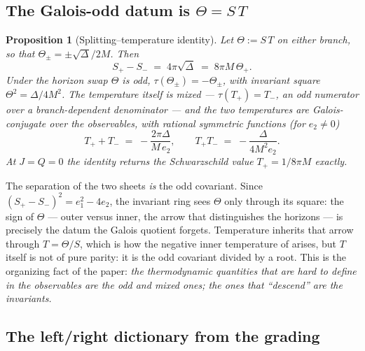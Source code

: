 \documentclass[11pt]{article}
\newtheorem{proposition}[theorem]{Proposition}
\theoremstyle{definition}
\theoremstyle{remark}
\newcommand{\disc}{\Delta}
\begin{document}
\subsection{The Galois-odd datum is \texorpdfstring{$\Theta=S\,T$}{Theta = S T}}

\begin{proposition}[Splitting--temperature identity]
\label{prop:splitting}
Let $\Theta:=S\,T$ on either branch, so that $\Theta_\pm=\pm\sqrt{\disc}/2M$.
Then
\[
S_+ - S_- \;=\; 4\pi\sqrt{\disc}\;=\;8\pi M\,\Theta_+ .
\]
Under the horizon swap $\Theta$ is odd, $\tau(\Theta_\pm)=-\Theta_\pm$, with
invariant square $\Theta^2=\disc/4M^2$. The temperature itself is mixed ---
$\tau(T_+)=T_-$, an odd numerator over a branch-dependent denominator --- and
the two temperatures are Galois-conjugate over the observables, with rational
symmetric functions (for $e_2\neq0$)
\[
T_+ + T_- \;=\; -\frac{2\pi\disc}{M\,e_2},\qquad
T_+ T_- \;=\; -\frac{\disc}{4M^2 e_2}.
\]
At $J=Q=0$ the identity returns the Schwarzschild value $T_+=1/8\pi M$
exactly.
\end{proposition}

The separation of the two sheets \emph{is} the odd covariant. Since
$(S_+-S_-)^2=e_1^2-4e_2$, the invariant ring sees $\Theta$ only through its
square: the sign of $\Theta$ --- outer versus inner, the arrow that
distinguishes the horizons --- is precisely the datum the Galois quotient
forgets. Temperature inherits that arrow through $T=\Theta/S$, which is how
the negative inner temperature of \cite{CGLP2018} arises, but $T$ itself is
not of pure parity: it is the odd covariant divided by a root. This is the
organizing fact of the paper: \emph{the thermodynamic quantities that are
hard to define in the observables are the odd and mixed ones; the ones that
``descend'' are the invariants.}

\subsection{The left/right dictionary from the grading}
\label{sec:dictionary}
\end{document}
